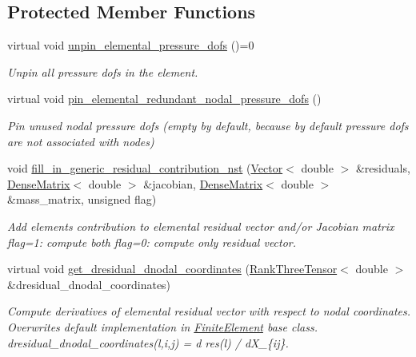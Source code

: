 \subsection*{Protected Member Functions}
\begin{DoxyCompactItemize}
\item 
virtual void \hyperlink{classoomph_1_1RefineableGeneralisedNewtonianNavierStokesEquations_a5e80fae3c3c4373e082867a49cc78ad0}{unpin\+\_\+elemental\+\_\+pressure\+\_\+dofs} ()=0
\begin{DoxyCompactList}\small\item\em Unpin all pressure dofs in the element. \end{DoxyCompactList}\item 
virtual void \hyperlink{classoomph_1_1RefineableGeneralisedNewtonianNavierStokesEquations_a9a4ca54f9b1f7d1b783b5ee0c561a236}{pin\+\_\+elemental\+\_\+redundant\+\_\+nodal\+\_\+pressure\+\_\+dofs} ()
\begin{DoxyCompactList}\small\item\em Pin unused nodal pressure dofs (empty by default, because by default pressure dofs are not associated with nodes) \end{DoxyCompactList}\item 
void \hyperlink{classoomph_1_1RefineableGeneralisedNewtonianNavierStokesEquations_abb7fde3310709225b8f9fbedfb7eca58}{fill\+\_\+in\+\_\+generic\+\_\+residual\+\_\+contribution\+\_\+nst} (\hyperlink{classoomph_1_1Vector}{Vector}$<$ double $>$ \&residuals, \hyperlink{classoomph_1_1DenseMatrix}{Dense\+Matrix}$<$ double $>$ \&jacobian, \hyperlink{classoomph_1_1DenseMatrix}{Dense\+Matrix}$<$ double $>$ \&mass\+\_\+matrix, unsigned flag)
\begin{DoxyCompactList}\small\item\em Add element\textquotesingle{}s contribution to elemental residual vector and/or Jacobian matrix flag=1\+: compute both flag=0\+: compute only residual vector. \end{DoxyCompactList}\item 
virtual void \hyperlink{classoomph_1_1RefineableGeneralisedNewtonianNavierStokesEquations_a0f5691d4db49d42d411a6ec08d29c45e}{get\+\_\+dresidual\+\_\+dnodal\+\_\+coordinates} (\hyperlink{classoomph_1_1RankThreeTensor}{Rank\+Three\+Tensor}$<$ double $>$ \&dresidual\+\_\+dnodal\+\_\+coordinates)
\begin{DoxyCompactList}\small\item\em Compute derivatives of elemental residual vector with respect to nodal coordinates. Overwrites default implementation in \hyperlink{classoomph_1_1FiniteElement}{Finite\+Element} base class. dresidual\+\_\+dnodal\+\_\+coordinates(l,i,j) = d res(l) / d\+X\+\_\+\{ij\}. \end{DoxyCompactList}\end{DoxyCompactItemize}
